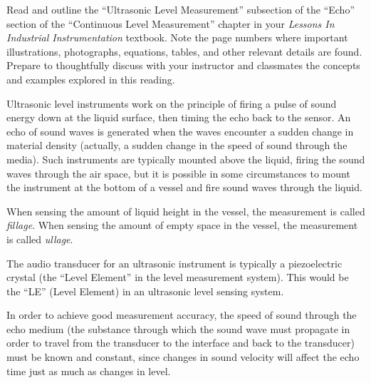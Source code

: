 

Read and outline the ``Ultrasonic Level Measurement'' subsection of the ``Echo'' section of the ``Continuous Level Measurement'' chapter in your {\it Lessons In Industrial Instrumentation} textbook.  Note the page numbers where important illustrations, photographs, equations, tables, and other relevant details are found.  Prepare to thoughtfully discuss with your instructor and classmates the concepts and examples explored in this reading.














Ultrasonic level instruments work on the principle of firing a pulse of sound energy down at the liquid surface, then timing the echo back to the sensor.  An echo of sound waves is generated when the waves encounter a sudden change in material density (actually, a sudden change in the speed of sound through the media).  Such instruments are typically mounted above the liquid, firing the sound waves through the air space, but it is possible in some circumstances to mount the instrument at the bottom of a vessel and fire sound waves through the liquid.

\vskip 10pt

When sensing the amount of liquid height in the vessel, the measurement is called {\it fillage}.  When sensing the amount of empty space in the vessel, the measurement is called {\it ullage}.

\vskip 10pt

The audio transducer for an ultrasonic instrument is typically a piezoelectric crystal (the ``Level Element'' in the level measurement system).  This would be the ``LE'' (Level Element) in an ultrasonic level sensing system.

\vskip 10pt

In order to achieve good measurement accuracy, the speed of sound through the echo medium (the substance through which the sound wave must propagate in order to travel from the transducer to the interface and back to the transducer) must be known and constant, since changes in sound velocity will affect the echo time just as much as changes in level.

